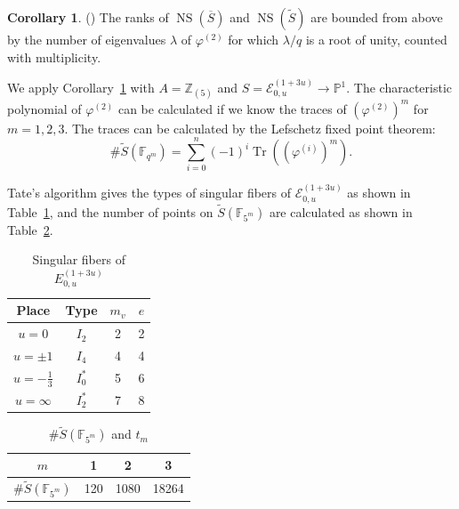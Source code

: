 \documentclass[a4paper]{jarticle} %
\theoremstyle{definition}
\newtheorem{cor}[thm]{Corollary}
\theoremstyle{remark}
\DeclareMathOperator{\NS}{NS}
\DeclareMathOperator{\Tr}{Tr}
\begin{document}
\begin{cor}{(\cite[Corollary 6.4.]{ref:vanluijk2007})}
    \label{cor:ns_upper_bound}
    The ranks of $\NS (\overline{S})$ and $\NS (\tilde{S})$ are bounded from above by the number of eigenvalues $\lambda$ of $\varphi^{(2)}$ for which $\lambda/q$ is a root of unity, counted with multiplicity.
\end{cor}

We apply Corollary~\ref{cor:ns_upper_bound} with $A = \mathbb{Z}_{(5)}$ and $S = \mathcal{E}_{0,u}^{(1 + 3u)} \to \mathbb{P}^1$.
The characteristic polynomial of $\varphi^{(2)}$ can be calculated if we know the traces of $(\varphi^{(2)})^m$ for $m=1,2,3$.
The traces can be calculated by the Lefschetz fixed point theorem:
\begin{equation*}
    \# \tilde{S}(\mathbb{F}_{q^{m}}) = \sum_{i = 0}^{n} ( - 1)^{i} \Tr((\varphi^{(i)})^{m}).
\end{equation*}

Tate's algorithm gives the types of singular fibers of $\mathcal{E}_{0,u}^{(1 + 3u)}$ as shown in Table~\ref{tab:E_{0,u}^{(1 + 3u)}}, 
and the number of points on $\tilde{S}(\mathbb{F}_{5^{m}})$ are calculated as shown in Table~\ref{tab:tm}.

\begin{table}[ht]
    \centering
    \caption{Singular fibers of $E_{0,u}^{(1 + 3u)}$}
    \begin{tabular}{|c|c|c|c|}
        \hline
        Place            & Type    & $m_v$ & $e$ \\
        \hline
        $u=0$            & $I_2$   & 2     & 2   \\
        $u=\pm 1$        & $I_4$   & 4     & 4   \\
        $u=-\frac{1}{3}$ & $I_0^*$ & 5     & 6   \\
        $u=\infty$       & $I_2^*$ & 7     & 8   \\
        \hline
    \end{tabular}
    \label{tab:E_{0,u}^{(1 + 3u)}}
\end{table}

\begin{table}[ht]
    \centering
    \caption{$\# \tilde{S}(\mathbb{F}_{5^{m}})$ and $t_{m}$}
    \begin{tabular}{|c|c|c|c|}
        \hline
        $m$                              & 1   & 2    & 3     \\
        \hline
        $\# \tilde{S}(\mathbb{F}_{5^m})$ & 120 & 1080 & 18264 \\
        \hline
    \end{tabular}
    \label{tab:tm}
\end{table}
\end{document}
